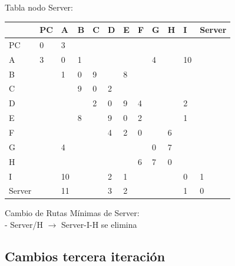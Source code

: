 \documentclass[a4paper]{article}
\begin{document}
\begin{table}[h]
Tabla nodo Server:\\
\begin{tabular}{|l|l|l|l|l|l|l|l|l|l|l|l|}
\hline
       & PC & A  & B & C & D & E & F & G & H & I  & Server \\ \hline
PC     & 0  & 3  &   &   &   &   &   &   &   &    &        \\ \hline
A      & 3  & 0  & 1 &   &   &   &   & 4 &   & 10 &        \\ \hline
B      &    & 1  & 0 & 9 &   & 8 &   &   &   &    &        \\ \hline
C      &    &    & 9 & 0 & 2 &   &   &   &   &    &        \\ \hline
D      &    &    &   & 2 & 0 & 9 & 4 &   &   & 2  &        \\ \hline
E      &    &    & 8 &   & 9 & 0 & 2 &   &   & 1  &        \\ \hline
F      &    &    &   &   & 4 & 2 & 0 &   & 6 &    &        \\ \hline
G      &    & 4  &   &   &   &   &   & 0 & 7 &    &        \\ \hline
H      &    &    &   &   &   &   & 6 & 7 & 0 &    &        \\ \hline
I      &    & 10 &   &   & 2 & 1 &   &   &   & 0  & 1      \\ \hline
Server &    & 11 &   &   & 3 & 2 &   &   &   & 1  & 0      \\ \hline
\end{tabular}

Cambio de Rutas Mínimas de Server:\\
-	Server/H  $\rightarrow$  Server-I-H  se elimina\\

\end{table}

\clearpage

\subsection{Cambios tercera iteración}
\end{document}

